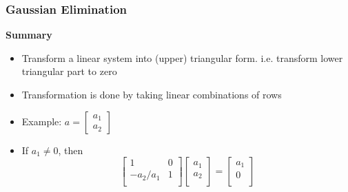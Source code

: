 \documentclass[10pt]{beamer}
\begin{document}
\begin{frame}
  \frametitle{Gaussian Elimination}
\textbf{Summary}
\begin{itemize}
  \item Transform a linear system into (upper) triangular form.  i.e.
transform lower triangular part to zero
\item Transformation is done by taking linear combinations of rows
\item Example: $a=\begin{bmatrix}a_1\\ a_2\end{bmatrix}$
\item If $a_1 \ne 0$, then
\[
\begin{bmatrix}
1 & 0 \\
-a_2 / a_1 & 1\\
\end{bmatrix}
\begin{bmatrix}
a_1 \\
a_2\\
\end{bmatrix}
=
\begin{bmatrix}
a_1 \\
0\\
\end{bmatrix}
\]
\end{itemize}
\end{frame}
\end{document}
